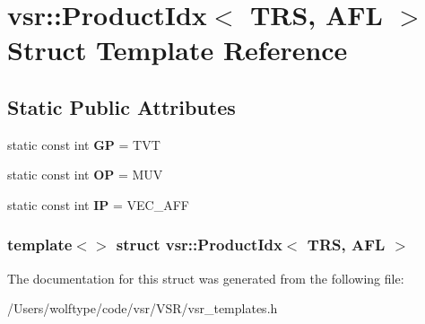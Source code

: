 \hypertarget{structvsr_1_1_product_idx_3_01_t_r_s_00_01_a_f_l_01_4}{\section{vsr\-:\-:Product\-Idx$<$ T\-R\-S, A\-F\-L $>$ Struct Template Reference}
\label{structvsr_1_1_product_idx_3_01_t_r_s_00_01_a_f_l_01_4}
}
\subsection*{Static Public Attributes}
\begin{DoxyCompactItemize}
\item 
\hypertarget{structvsr_1_1_product_idx_3_01_t_r_s_00_01_a_f_l_01_4_a1ed26959513dda50b66aaeb575509939}{static const int {\bfseries G\-P} = T\-V\-T}\label{structvsr_1_1_product_idx_3_01_t_r_s_00_01_a_f_l_01_4_a1ed26959513dda50b66aaeb575509939}

\item 
\hypertarget{structvsr_1_1_product_idx_3_01_t_r_s_00_01_a_f_l_01_4_aaec93eb3b512962e4eb095f76398835f}{static const int {\bfseries O\-P} = M\-U\-V}\label{structvsr_1_1_product_idx_3_01_t_r_s_00_01_a_f_l_01_4_aaec93eb3b512962e4eb095f76398835f}

\item 
\hypertarget{structvsr_1_1_product_idx_3_01_t_r_s_00_01_a_f_l_01_4_ae29799170f62a62943152d03958ac18d}{static const int {\bfseries I\-P} = V\-E\-C\-\_\-\-A\-F\-F}\label{structvsr_1_1_product_idx_3_01_t_r_s_00_01_a_f_l_01_4_ae29799170f62a62943152d03958ac18d}

\end{DoxyCompactItemize}
\subsubsection*{template$<$$>$ struct vsr\-::\-Product\-Idx$<$ T\-R\-S, A\-F\-L $>$}



The documentation for this struct was generated from the following file\-:\begin{DoxyCompactItemize}
\item 
/\-Users/wolftype/code/vsr/\-V\-S\-R/vsr\-\_\-templates.\-h\end{DoxyCompactItemize}

